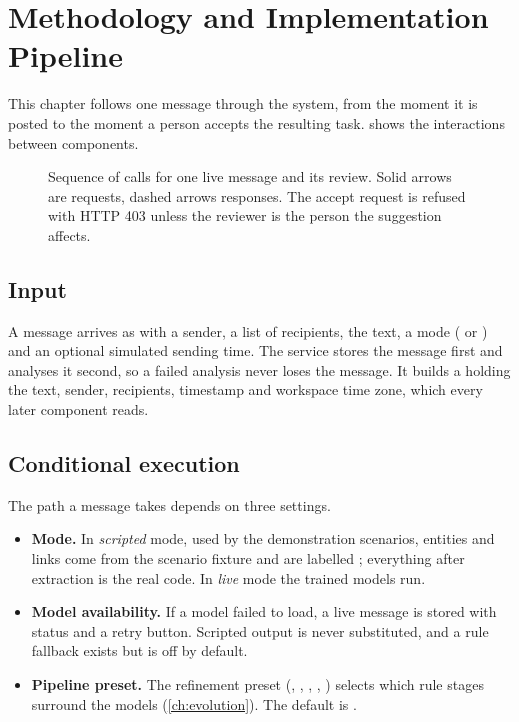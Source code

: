 \chapter{Methodology and Implementation Pipeline}
\label{ch:methodology}

This chapter follows one message through the system, from the moment it is posted to the moment a person accepts the resulting task.  shows the interactions between components.

\begin{figure}[t]
\centering
{}
\caption[Application sequence diagram]{Sequence of calls for one live message and its review. Solid arrows are requests, dashed arrows responses. The accept request is refused with HTTP 403 unless the reviewer is the person the suggestion affects.}
\label{fig:sequence}
\end{figure}

\section{Input}
A message arrives as  with a sender, a list of recipients, the text, a mode ( or ) and an optional simulated sending time. The service stores the message first and analyses it second, so a failed analysis never loses the message. It builds a  holding the text, sender, recipients, timestamp and workspace time zone, which every later component reads.

\section{Conditional execution}
The path a message takes depends on three settings.
\begin{itemize}
  \item \textbf{Mode.} In \emph{scripted} mode, used by the demonstration scenarios, entities and links come from the scenario fixture and are labelled ; everything after extraction is the real code. In \emph{live} mode the trained models run.
  \item \textbf{Model availability.} If a model failed to load, a live message is stored with status  and a retry button. Scripted output is never substituted, and a rule fallback exists but is off by default.
  \item \textbf{Pipeline preset.} The refinement preset (, , , , ) selects which rule stages surround the models (\cref{ch:evolution}). The default is .
\end{itemize}

